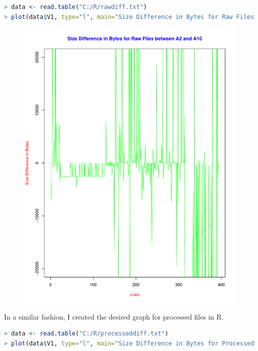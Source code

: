 \documentclass[a4paper, 11pt]{article}
\begin{document}
\begin{lstlisting}[language=R, breakatwhitespace=〈false), label=Command, caption=R code to create the graph]
> data <- read.table("C:/R/rawdiff.txt")
> plot(data$V1, type="l", main="Size Difference in Bytes for Raw Files between A2 and A10", col.main="blue", col="green", xlab ="Links",ylab="Size Difference in Bytes", col.lab="red", ylim=c(-20000,20000))
\end{lstlisting}
   
\begin{figure}[H]
\centering
\includegraphics[scale=0.5]{rawdiff.pdf}
\end{figure}

In a similar fashion, I created the desired graph for processed files in R.

\begin{lstlisting}[language=R, breakatwhitespace=〈false), label=Command, caption=R code to create the graph]
> data <- read.table("C:/R/processeddiff.txt")
> plot(data$V1, type="l", main="Size Difference in Bytes for Processed Files between A2 and A10", col.main="blue", col="green", xlab ="Links",ylab="Size Difference in Bytes", col.lab="red", ylim=c(-2000,2000))
\end{lstlisting}
   
\end{document}
